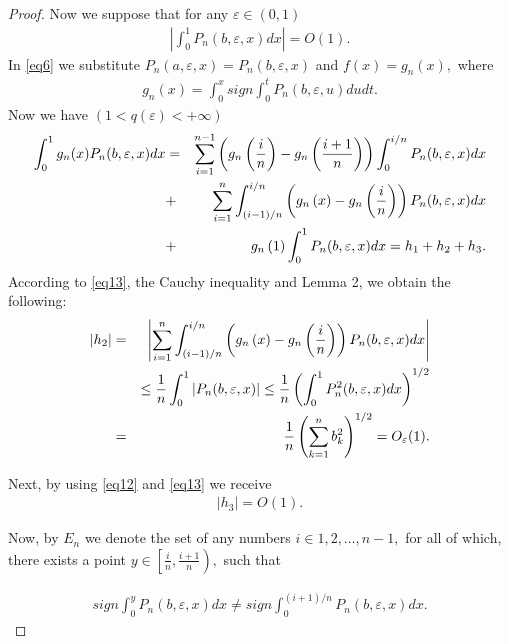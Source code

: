 \documentclass[10pt,a4paper]{amsart}
\begin{document}
\begin{proof}
		Now we suppose that for any $\varepsilon \in (0,1)$
		\begin{eqnarray}
			\label{eq12} \left|\int_{0}^{1} P_n (b, \varepsilon, x) dx\right| = O(1).
		\end{eqnarray}
		In \eqref{eq6} we substitute $P_n( a, \varepsilon, x)=P_n(b, \varepsilon,x)$ and $f(x)= g_n (x),$ where	
		\begin{eqnarray}
			\label{eq13} g_n(x) = \int_{0}^{x} sign \int_{0}^{t} P_n(b,  \varepsilon, u)du dt.
		\end{eqnarray}
		Now we have $(1<q(\varepsilon)<+\infty)$
		\begin{eqnarray}
			\label{eq14} \int_{0}^{1} g_n (x) P_n (b, \varepsilon, x) dx
			&=& \sum_{i=1}^{n-1}\left(g_n\left(\frac{i}{n}\right)-g_n\left(\frac{i+1}{n}\right)\right)\int_{0}^{i/n}P_n(b, \varepsilon, x)dx \notag   \\
			&+& \sum_{i=1}^{n}\int_{\left(i-1\right)/n}^{i/n}\left(g_n\left(x\right) -g_n\left(\frac{i}{n}\right)\right)P_n(b, \varepsilon, x) dx  \notag    \\
			&+& g_n\left(1\right)\int_{0}^{1}P_n(b, \varepsilon, x)dx=h_1 +h_2  +h_3.   
		\end{eqnarray}
		According to \eqref{eq13}, the Cauchy inequality and Lemma 2, we obtain the following:	
		\begin{eqnarray} \label{eq15}
			\left|h_2\right| &=& \left| \sum_{i=1}^{n}\int_{\left(i-1\right)/n}^{i/n}\left(g_n\left(x\right) -g_n\left(\frac{i}{n}\right)\right)P_n(b, \varepsilon, x) dx \right|   \\ 
			&& \leq \frac{1}{n} \int_{0}^{1} \left|P_n (b, \varepsilon, x)\right| \leq \frac{1}{n} \left(\int_{0}^{1} P_n^2 (b, \varepsilon, x)dx\right)^{1/2} \notag\\   
			&=& \frac{1}{n} \left(\sum_{k=1}^{n} b_k^2\right)^{1/2}  = O_{\varepsilon}(1). \notag
		\end{eqnarray}
		
		Next, by using \eqref{eq12} and \eqref{eq13} we receive 
		\begin{eqnarray}
			\label{eq16}
			\left|h_3\right| = O(1).
		\end{eqnarray}
		
		Now, by $E_n$ we denote the set of any numbers $i\in {1,2,\dots,n-1},$ for all of which, there exists a point $y\in \left[\frac{i}{n}, \frac{i+1}{n} \right),$   such that 
		
		\begin{eqnarray*}
			sign\int_{0}^{y} P_n(b, \varepsilon, x) dx \ne sign\int_{0}^{(i+1)/n} P_n(b, \varepsilon, x) dx.
		\end{eqnarray*}
		

\end{proof}
\end{document}
